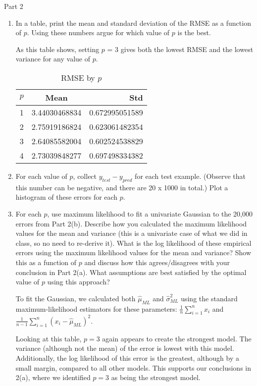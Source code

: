 \documentclass[11pt]{article}
\begin{document}
Part 2
\begin{enumerate}
\item In a table, print the mean and standard deviation of the RMSE as a function of $p$. Using these numbers argue for which value of $p$ is the best.

As this table shows, setting $p$ = 3 gives both the lowest RMSE and the lowest variance for any value of $p$.

\begin{table}[!th]
\centering
\begin{tabular}{|l|c|r|}
\hline
$p$ & Mean & Std \\
\hline
1 & 3.44030468834 & 0.672995051589 \\
2 & 2.75919186824 & 0.623061482354 \\
3 & 2.64085582004 & 0.602524538829 \\
4 & 2.73039848277 & 0.697498334382 \\
\hline
\end{tabular}
\caption{RMSE by $p$}
\label{ex:table}
\end{table}

\item For each value of $p$, collect $y_{test} - y_{pred}$ for each test example. (Observe that this number can be negative, and there are 20 x 1000 in total.) Plot a histogram of these errors for each $p$.



\item For each $p$, use maximum likelihood to fit a univariate Gaussian to the 20,000 errors from Part 2(b). Describe how you calculated the maximum likelihood values for the mean and variance (this is a univariate case of what we did in class, so no need to re-derive it). What is the log likelihood of these empirical errors using the maximum likelihood values for the mean and variance? Show this as a function of $p$ and discuss how this agrees/disagrees with your conclusion in Part 2(a). What assumptions are best satisfied by the optimal value of $p$ using this approach?

To fit the Gaussian, we calculated both $\hat \mu_{ML}$ and $\hat \sigma^2_{ML}$ using the standard maximum-likelihood estimators for these parameters: $\frac{1}{n} \sum_{i=1}^{n} x_i$ and $\frac{1}{n-1} \sum_{i=1}^{n} (x_i - \hat \mu_{ML})^2$.

Looking at this table, $p = 3$ again appears to create the strongest model. The variance (although not the mean) of the error is lowest with this model. Additionally, the log likelihood of this error is the greatest, although by a small margin, compared to all other models. This supports our conclusions in 2(a), where we identified $p = 3$ as being the strongest model.


\end{enumerate}
\end{document}
